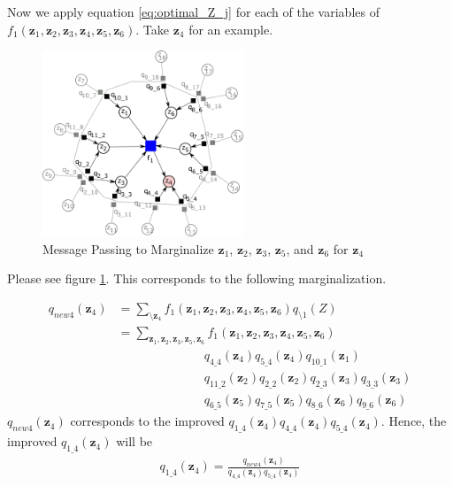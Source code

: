 \documentclass[a4]{article}
\begin{document}
Now we apply equation \ref{eq:optimal_Z_j} for each of the variables of 
$f_1(\bm{z}_1, \bm{z}_2, \bm{z}_3, \bm{z}_4, \bm{z}_5, \bm{z}_6)$.
Take $\bm{z}_4$ for an example.

\begin{figure}[!htb]
\centering
\includegraphics[width=6cm]{fig04.png}
\caption{Message Passing to Marginalize $\bm{z}_1$, $\bm{z}_2$, $\bm{z}_3$, $\bm{z}_5$, and $\bm{z}_6$ for $\bm{z}_4$ }
\label{fig:fig04}
\end{figure}

Please see figure \ref{fig:fig04}. This corresponds to the following marginalization.

\begin{equation}
\begin{aligned}
q_{new4}(\bm{z}_4) &= \sum_{\setminus \bm{z}_4}f_1(\bm{z}_1,\bm{z}_2,\bm{z}_3,\bm{z}_4,\bm{z}_5,\bm{z}_6)
q_{\setminus 1}(Z)\\
&= \sum_{ \bm{z}_1,\bm{z}_2,\bm{z}_3,\bm{z}_5,\bm{z}_6 }
f_1(\bm{z}_1,\bm{z}_2,\bm{z}_3,\bm{z}_4,\bm{z}_5,\bm{z}_6)\\
&\hspace{7em}q_{4\_4}(\bm{z}_4)
q_{5\_4}(\bm{z}_4)
q_{10\_1}(\bm{z}_1)\\
&\hspace{7em}q_{11\_2}(\bm{z}_2)
q_{2\_2}(\bm{z}_2)
q_{2\_3}(\bm{z}_3)
q_{3\_3}(\bm{z}_3)\\
&\hspace{7em}q_{6\_5}(\bm{z}_5)
q_{7\_5}(\bm{z}_5)
q_{8\_6}(\bm{z}_6)
q_{9\_6}(\bm{z}_6)
\end{aligned}
\end{equation}
$q_{new4}(\bm{z}_4)$ corresponds to the improved $q_{1\_4}(\bm{z}_4)q_{4\_4}(\bm{z}_4)q_{5\_4}(\bm{z}_4)$.
Hence, the improved $q_{1\_4}(\bm{z}_4)$ will be 
\begin{equation}
\begin{aligned}
q_{1\_4}(\bm{z}_4) = \frac{q_{new4}(\bm{z}_4)}{q_{4\_4}(\bm{z}_4)q_{5\_4}(\bm{z}_4)}
\end{aligned}
\end{equation}
\end{document}
